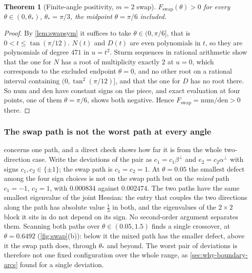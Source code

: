 \documentclass[11pt,reqno]{amsart}
\renewcommand{\_}{\origunderscore\allowbreak}
\numberwithin{equation}{section}
\theoremstyle{plain}
\newtheorem{thm}{Theorem}[section]
\theoremstyle{definition}
\theoremstyle{remark}
\begin{document}
\begin{thm}[Finite-angle positivity, $m=2$ swap]\label{thm:swap-m2-new}
$F_{\mathrm{swap}}(\theta)>0$ for every $\theta\in(0,\theta_*)$,
$\theta_*=\pi/3$, the midpoint $\theta=\pi/6$ included.
\end{thm}

\begin{proof}
By \cref{lem:swapsym} it suffices to take $\theta\in(0,\pi/6]$, that is
$0<t\le\tan(\pi/12)$. $N(t)$ and $D(t)$ are even polynomials in $t$, so
they are polynomials of degree $471$ in $u=t^2$. Sturm sequences in
rational arithmetic show that the one for $N$ has a root of multiplicity
exactly $2$ at $u=0$, which corresponds to the excluded endpoint
$\theta=0$, and no other root on a rational interval containing
$(0,\tan^2(\pi/12)]$, and that the one for $D$ has no root there. So
$\mathrm{num}$ and $\mathrm{den}$ have constant signs on the piece, and
exact evaluation at four points, one of them $\theta=\pi/6$, shows both
negative. Hence $F_{\mathrm{swap}}=\mathrm{num}/\mathrm{den}>0$ there.
\end{proof}

\subsubsection{The swap path is not the worst path at every angle}\label{sec:swap-not-worst}

 concerns one path, and a direct check shows how
far it is from the whole two-direction case. Write the deviations of the
pair as $e_1=c_1\beta^\perp$ and $e_2=c_2\alpha^\perp$ with signs
$c_1,c_2\in\{\pm1\}$; the swap path is $c_1=c_2=1$. At $\theta=0.05$ the
smallest defect among the four sign choices is not on the swap path but on
the \emph{mixed} path $c_1=-1$, $c_2=1$, with $0.000834$ against
$0.002474$. The two paths have the same smallest eigenvalue of the joint
Hessian: the entry that couples the two directions along the path has
absolute value $\tfrac13$ in both, and the eigenvalues of the
$2\times2$ block it sits in do not depend on its sign. No second-order
argument separates them. Scanning both paths over $\theta\in(0.05,1.5)$
finds a single crossover, at $\theta=0.6492$ (\cref{fig:swap}(b)): below
it the mixed path has the smaller defect, above it the swap path does,
through $\theta_*$ and beyond. The worst pair of deviations is therefore
not one fixed configuration over the whole range, as
\cref{sec:why-boundary-arcs} found for a single deviation.
\end{document}
